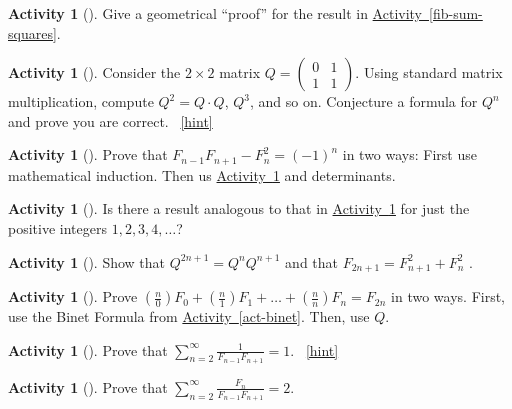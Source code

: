\documentclass[10pt,]{book}
\theoremstyle{plain}
\theoremstyle{definition}
\theoremstyle{definition}
\theoremstyle{definition}
\newtheorem{activity}[project]{Activity}
\numberwithin{equation}{chapter}
\newcommand{\amp}{&}
\begin{document}
\begin{activity}[]\label{activity-148}
\hypertarget{p-970}{}%
Give a geometrical ``proof'' for the result in \hyperref[fib-sum-squares]{Activity~\ref{fib-sum-squares}}.%
\end{activity}
\begin{activity}[]\label{fib-matrix}
\hypertarget{p-971}{}%
Consider the \(2\times 2\) matrix \(Q =
\begin{pmatrix}
0 \amp 1\\
1 \amp 1
\end{pmatrix}.\) Using standard matrix multiplication, compute \(Q^2 = Q\cdot Q\), \(Q^3\), and so on.  Conjecture a formula for \(Q^n\) and prove you are correct.%
~\hfill{\tiny\hyperlink{a-156}{[hint]}\hypertarget{q-156}{}}\end{activity}
\begin{activity}[]\label{fib-neg-one}
\hypertarget{p-973}{}%
Prove that \(F_{n - 1}F_{n + 1} - F_{n}^{2} = (-1)^{n}\) in two ways:  First use mathematical induction.  Then us \hyperref[fib-matrix]{Activity~\ref{fib-matrix}} and determinants.%
\end{activity}
\begin{activity}[]\label{activity-151}
\hypertarget{p-974}{}%
Is there a result analogous to that in \hyperref[fib-neg-one]{Activity~\ref{fib-neg-one}} for just the positive integers \(1, 2, 3, 4, \ldots\)?%
\end{activity}
\begin{activity}[]\label{activity-152}
\hypertarget{p-975}{}%
Show that \(Q^{2n + 1} = Q^{n}Q^{n+1}\) and that \(F_{2n + 1} = F_{n + 1}^{2} + F_{n}^{2}\) .%
\end{activity}
\begin{activity}[]\label{activity-153}
\hypertarget{p-976}{}%
Prove \(\left( \frac{n}{0} \right)F_{0} + \left( \frac{n}{1} \right)F_{1} + \ldots + \left( \frac{n}{n} \right)F_{n} = F_{2n}\) in two ways.  First, use the Binet Formula from \hyperref[act-binet]{Activity~\ref{act-binet}}.  Then, use \(Q\).%
\end{activity}
\begin{activity}[]\label{activity-154}
\hypertarget{p-977}{}%
Prove that \(\sum_{n = 2}^{\infty}\frac{1}{F_{n - 1}F_{n + 1}} = 1\).%
~\hfill{\tiny\hyperlink{a-161}{[hint]}\hypertarget{q-161}{}}\end{activity}
\begin{activity}[]\label{activity-155}
\hypertarget{p-979}{}%
Prove that \(\sum_{n = 2}^{\infty}\frac{F_{n}}{F_{n - 1}F_{n + 1}} = 2.\)%
\end{activity}
\end{document}
